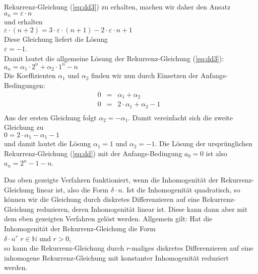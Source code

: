 \begin{enumerate}
      Rekurrenz-Gleichung
      (\ref{eq:dd3}) zu erhalten, machen wir daher den Ansatz \\[0.2cm]
      \hspace*{1.3cm} $a_n = \varepsilon \cdot n$ \\[0.2cm]
      und erhalten \\[0.2cm]
      \hspace*{1.3cm} 
      $\varepsilon \cdot (n+2) = 3 \cdot \varepsilon \cdot (n+1) - 2 \cdot \varepsilon \cdot n + 1$ 
      \\[0.2cm]
      Diese Gleichung liefert die Lösung \\[0.2cm]
      \hspace*{1.3cm} 
      $\varepsilon = -1$. \\[0.2cm]
      Damit lautet die allgemeine Lösung der Rekurrenz-Gleichung (\ref{eq:dd3}): \\[0.2cm]
      \hspace*{1.3cm} $a_n = \alpha_1 \cdot 2^n + \alpha_2 \cdot 1^n - n$ \\[0.2cm]
      Die Koeffizienten $\alpha_1$ und $\alpha_2$ finden wir nun durch Einsetzen der
      Anfangs-Bedingungen:
      \[
      \begin{array}{lcl}
        0 & = & \alpha_1 + \alpha_2 \\
        0 & = & 2 \cdot \alpha_1 + \alpha_2 - 1 \\
      \end{array}
      \]
      Aus der ersten Gleichung folgt $\alpha_2 = - \alpha_1$.  Damit vereinfacht sich die
      zweite Gleichung zu \\[0.2cm]
      \hspace*{1.3cm} $0 = 2 \cdot \alpha_1 - \alpha_1 - 1$ \\[0.2cm]
      und damit lautet die Lösung $\alpha_1 = 1$ und $\alpha_2 = -1$.  Die Lösung der
      ursprünglichen Rekurrenz-Gleichung (\ref{eq:dd}) mit der Anfangs-Bedingung $a_0 = 0$ 
      ist also \\[0.2cm]
      \hspace*{1.3cm} $a_n = 2^n - 1 - n$.
\end{enumerate}
Das oben gezeigte Verfahren funktioniert, wenn die Inhomogenität der Rekurrenz-Gleichung
linear ist, also die Form $\delta \cdot n$.  Ist die Inhomogenität quadratisch, so können wir
die Gleichung durch diskretes Differenzieren auf eine Rekurrenz-Gleichung reduzieren,
deren Inhomogenität linear ist.  Diese kann dann aber mit dem eben gezeigten Verfahren
gelöst werden.  Allgemein gilt:  Hat die Inhomogenität der Rekurrenz-Gleichung die Form \\[0.2cm]
\hspace*{1.3cm} $\delta \cdot n^r$ \quad $r \in \mathbb{N}$ und $r > 0$, \\[0.2cm]
so kann die Rekurrenz-Gleichung durch $r$-maliges diskretes Differenzieren auf eine
inhomogene Rekurrenz-Gleichung mit konstanter Inhomogenität reduziert werden.
\vspace*{0.3cm}
\pagebreak

